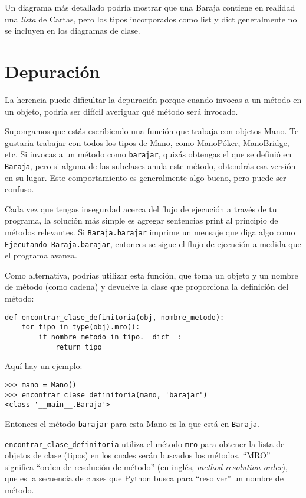 \documentclass[10pt]{book}
\begin{document}
Un diagrama más detallado podría mostrar que una Baraja contiene
en realidad una {\em lista} de Cartas, pero los tipos incorporados
como list y dict generalmente no se incluyen en los diagramas de clase.


\section{Depuración}

La herencia puede dificultar la depuración porque cuando invocas a un
método en un objeto, podría ser difícil averiguar qué método
será invocado.

Supongamos que estás escribiendo una función que trabaja con objetos Mano.
Te gustaría trabajar con todos los tipos de Mano, como
ManoPóker, ManoBridge, etc.  Si invocas a un método como
{\tt barajar}, quizás obtengas el que se definió en {\tt Baraja},
pero si alguna de las subclases anula este método,
obtendrás esa versión en su lugar.  Este comportamiento es generalmente algo
bueno, pero puede ser confuso.

Cada vez que tengas insegurdad acerca del flujo de ejecución a través de tu
programa, la solución más simple es agregar sentencias print al
principio de métodos relevantes.  Si {\tt Baraja.barajar} imprime un
mensaje que diga algo como {\tt Ejecutando Baraja.barajar}, entonces
se sigue el flujo de ejecución a medida que el programa avanza.

Como alternativa, podrías utilizar esta función, que toma un
objeto y un nombre de método (como cadena) y devuelve la clase que
proporciona la definición del método:

\begin{verbatim}
def encontrar_clase_definitoria(obj, nombre_metodo):
    for tipo in type(obj).mro():
        if nombre_metodo in tipo.__dict__:
            return tipo
\end{verbatim}
%
Aquí hay un ejemplo:

\begin{verbatim}
>>> mano = Mano()
>>> encontrar_clase_definitoria(mano, 'barajar')
<class '__main__.Baraja'>
\end{verbatim}
%
Entonces el método {\tt barajar} para esta Mano es la que está en {\tt Baraja}.

\verb"encontrar_clase_definitoria" utiliza el método {\tt mro} para obtener la lista de
objetos de clase (tipos) en los cuales serán buscados los métodos.  ``MRO''
significa ``orden de resolución de método'' (en inglés, {\em method resolution order}), que es la secuencia de
clases que Python busca para ``resolver'' un nombre de método.
\end{document}
